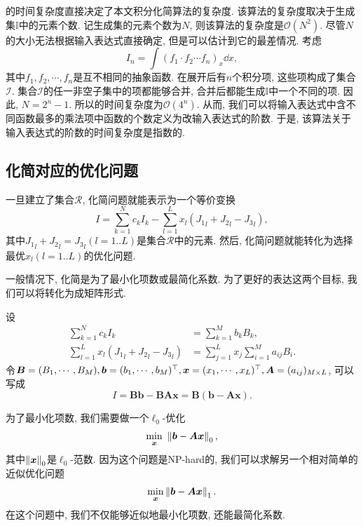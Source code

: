 的时间复杂度直接决定了本文积分化简算法的复杂度. 该算法的复杂度取决于生成集$\mathbb I$中的元素个数. 记生成集的元素个数为$N$, 则该算法的复杂度是$\mathcal O(N^2)$. 尽管$N$的大小无法根据输入表达式直接确定, 但是可以估计到它的最差情况. 考虑
\begin{equation}
I_n=\int\!{(f_1\cdot f_2\cdots f_n)_x \dd x},
\label{worst_case}
\end{equation}
其中$f_1,f_2,\cdots,f_n$是互不相同的抽象函数. 在展开后有$n$个积分项, 这些项构成了集合$\mathcal I$. 集合$\mathcal I$的任一非空子集中的项都能够合并, 合并后都能生成$\mathbb I$中一个不同的项. 因此, $N=2^n-1$. 所以的时间复杂度为$\mathcal O(4^n)$. 从而, 我们可以将输入表达式中含不同函数最多的乘法项中函数的个数定义为改输入表达式的阶数. 于是, 该算法关于输入表达式的阶数的时间复杂度是指数的. 

\subsection{化简对应的优化问题}\label{optimization-03}
一旦建立了集合$\mathcal R$, 化简问题就能表示为一个等价变换
\begin{equation}
I=\sum_{k=1}^N{c_k I_k}-\sum_{l=1}^L{x_l ({J_1}_l+{J_2}_l-{J_3}_l)},
\label{normal_simplify}
\end{equation}
其中${J_1}_l+{J_2}_l={J_3}_l(l=1..L)$是集合$\mathcal R$中的元素. 然后, 化简问题就能转化为选择最优$x_l(l=1..L)$的优化问题.

一般情况下, 化简是为了最小化项数或最简化系数. 为了更好的表达这两个目标, 我们可以将转化为成矩阵形式. 

设 
\begin{equation}
\begin{split}
\sum_{k=1}^N{c_k I_k} &= \sum_{k=1}^M{b_k B_k},\\
\sum_{l=1}^L{x_l ({J_1}_l+{J_2}_l-{J_3}_l)} &= \sum_{j=1}^L{x_j \sum_{i=1}^M{a_{ij} B_i}}.
\end{split}
\end{equation} 
令$\bm B=(B_1,\cdots,B_M),\bm b=(b_1,\cdots,b_M)^\top,\bm x=(x_1,\cdots,x_L)^\top,\bm A=(a_{ij})_{M \times L}$, 可以写成 
\begin{equation}
I=\bm{B}\bm{b}-\bm{B}\bm{A}\bm{x}=\bm{B}(\bm{b}-\bm{A}\bm{x}).
\end{equation}

为了最小化项数, 我们需要做一个$\ell_0$-优化
\begin{equation}
    \underset{\bm x}\min~\left\Vert\bm{b}-\bm{A}\bm{x}\right\Vert_0,
\end{equation}
其中$\left\Vert\bm x\right\Vert_0$是$\ell_0$-范数. 因为这个问题是NP-hard的, 我们可以求解另一个相对简单的近似优化问题
\begin{equation}
\underset{\bm x}\min\left\Vert\bm{b}-\bm{A}\bm{x}\right\Vert_1.
\label{LAE}
\end{equation}
在这个问题中, 我们不仅能够近似地最小化项数, 还能最简化系数. 

